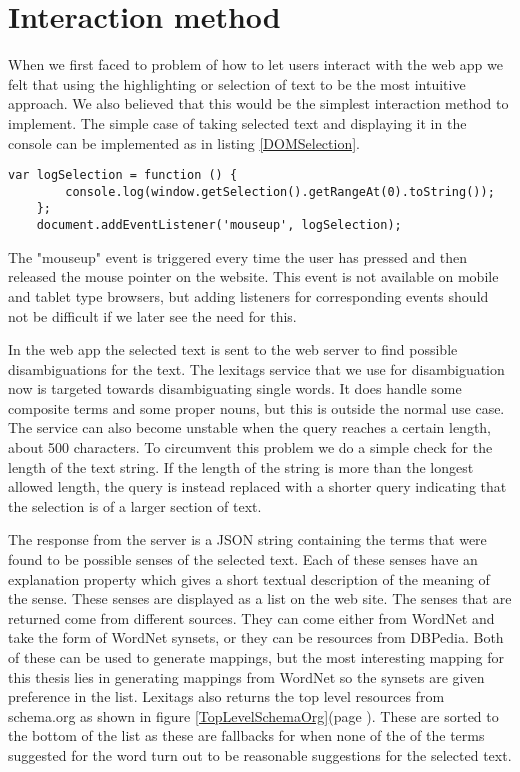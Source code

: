 \section{Interaction method}
\label{Interaction}
When we first faced to problem of how to let users interact with the web app we felt that using the highlighting or
selection of text to be the most intuitive approach.
We also believed that this would be the simplest interaction method to implement.
The simple case of taking selected text and displaying it in the console can be implemented as in listing \ref{DOMSelection}.

\begin{lstlisting}[caption={Logging selected text}, label=DOMSelection]
	var logSelection = function () {
		console.log(window.getSelection().getRangeAt(0).toString());
	};
	document.addEventListener('mouseup', logSelection);
\end{lstlisting}

The "mouseup" event is triggered every time the user has pressed and then released the mouse pointer on the website.
This event is not available on mobile and tablet type browsers,
but adding listeners for corresponding events should not be difficult if we later see the need for this.

In the web app the selected text is sent to the web server to find possible disambiguations for the text.
The lexitags service that we use for disambiguation now is targeted towards disambiguating single words.
It does handle some composite terms and some proper nouns, but this is outside the normal use case.
The service can also become unstable when the query reaches a certain length, about 500 characters.
To circumvent this problem we do a simple check for the length of the text string.
If the length of the string is more than the longest allowed length,
the query is instead replaced with a shorter query indicating that the selection is of a larger section of text.

The response from the server is a JSON string containing the terms that were found to be possible senses of the selected text.
Each of these senses have an explanation property which gives a short textual description of the meaning of the sense.
These senses are displayed as a list on the web site.
The senses that are returned come from different sources.
They can come either from WordNet and take the form of WordNet synsets, or they can be resources from DBPedia.
Both of these can be used to generate mappings,
but the most interesting mapping for this thesis lies in generating mappings from WordNet so the synsets are given preference in the list.
Lexitags also returns the top level resources from schema.org as shown in figure \ref{TopLevelSchemaOrg}(page \pageref{TopLevelSchemaOrg}).
These are sorted to the bottom of the list as these are fallbacks for when none of the of the terms suggested for
the word turn out to be reasonable suggestions for the selected text.

